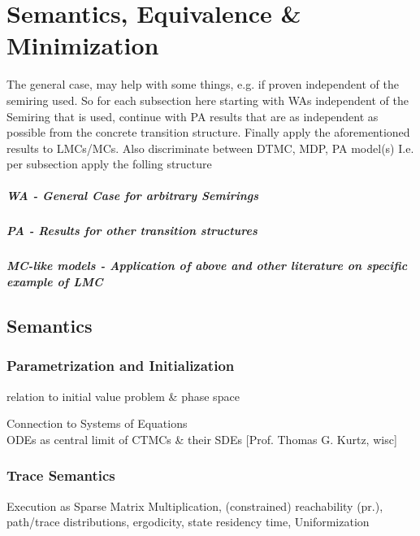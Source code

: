 \chapter{Semantics, Equivalence \& Minimization}\label{\positionnumber}  
        The general case, may help with some things, e.g. if proven independent of the semiring used. So for each subsection here starting with WAs independent of the Semiring that is used, continue with PA results that are as independent as possible from the concrete transition structure. Finally apply the aforementioned results to LMCs/MCs. Also discriminate between DTMC, MDP, PA model(s) I.e. per subsection apply the folling structure
        
            \paragraph{WA - General Case for arbitrary Semirings}
            
            \paragraph{PA - Results for other transition structures}
            
            \paragraph{MC-like models - Application of above and other literature on specific example of LMC}


    \section{Semantics}
        \subsection{Parametrization and Initialization}
            relation to initial value problem \& phase space
            
             Connection to Systems of Equations \\         ODEs as central limit of CTMCs \& their SDEs
        [Prof. Thomas G. Kurtz, wisc] \\
            
        \subsection{Trace Semantics}
            Execution as Sparse Matrix Multiplication, 
            (constrained) reachability (pr.), path/trace distributions,
            ergodicity, state residency time, Uniformization
            
